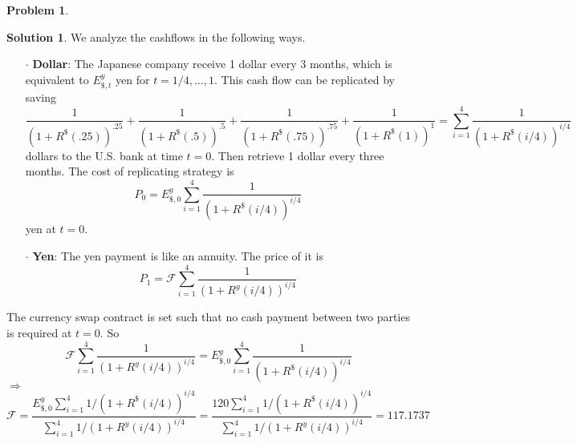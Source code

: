 \documentclass[a4paper, 10pt]{article}
\theoremstyle{definition}
\newtheorem{problem}{Problem}
\theoremstyle{hSol}
\newtheorem*{solution}{Solution}
\begin{document}
\begin{problem} 
\end{problem}
\begin{solution} We analyze the cashflows in the following ways.
\begin{itemize}
  \item[$\cdot$] \textbf{Dollar}: The Japanese company receive 1 dollar every 3 months, which is equivalent to $E_{\$, t}^y$ yen for $t=1/4, ..., 1$. This cash flow can be replicated by saving
  $$
  \frac{1}{(1+R^{\$}(.25))^{.25}} + \frac{1}{(1+R^{\$}(.5))^{.5}} + \frac{1}{(1+R^{\$}(.75))^{.75}}+ \frac{1}{(1+R^{\$}(1))^{1}} = \sum_{i=1}^4 \frac{1}{(1+R^{\$}(i/4))^{i/4}}
  $$
  dollars to the U.S. bank at time $t=0$. Then retrieve 1 dollar every three months. The cost of replicating strategy is 
  $$
  P_0 = E_{\$,0}^y\sum_{i=1}^4 \frac{1}{(1+R^{\$}(i/4))^{i/4}}
  $$
  yen at $t=0$.
  \item[$\cdot$] \textbf{Yen}: The yen payment is like an annuity. The price of it is
  $$
  P_1 = \mathcal{F}\sum_{i=1}^4 \frac{1}{(1+R^{y}(i/4))^{i/4}}
  $$
\end{itemize}
The currency swap contract is set such that no cash payment between two parties is required at $t=0$. So
$$
\mathcal{F}\sum_{i=1}^4 \frac{1}{(1+R^{y}(i/4))^{i/4}} = E_{\$,0}^y\sum_{i=1}^4 \frac{1}{(1+R^{\$}(i/4))^{i/4}}
$$
$\Rightarrow$
$$
\mathcal{F} = \frac{E_{\$,0}^y\sum_{i=1}^4 1/(1+R^{\$}(i/4))^{i/4}}{\sum_{i=1}^4 1/(1+R^{y}(i/4))^{i/4}} =\frac{120\sum_{i=1}^4 1/(1+R^{\$}(i/4))^{i/4}}{\sum_{i=1}^4 1/(1+R^{y}(i/4))^{i/4}} = 117.1737
$$
\end{solution}
\end{document}
